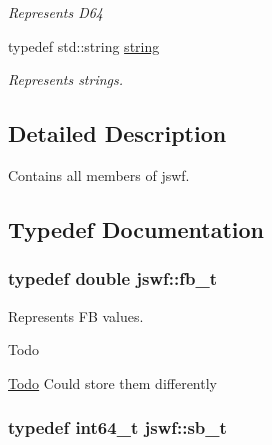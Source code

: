\begin{DoxyCompactItemize}
\begin{DoxyCompactList}\small\item\em Represents {\ttfamily D64} \end{DoxyCompactList}\item 
\hypertarget{namespacejswf_a755127d61081aa8af105eb800aa2c1ec}{typedef std\+::string \hyperlink{namespacejswf_a755127d61081aa8af105eb800aa2c1ec}{string}}\label{namespacejswf_a755127d61081aa8af105eb800aa2c1ec}

\begin{DoxyCompactList}\small\item\em Represents strings. \end{DoxyCompactList}\end{DoxyCompactItemize}


\subsection{Detailed Description}
Contains all members of jswf. 

\subsection{Typedef Documentation}
\hypertarget{namespacejswf_a419cb8aa8b625074e6753d189783b2f4}{
\subsubsection[{fb\+\_\+t}]{\setlength{\rightskip}{0pt plus 5cm}typedef double {\bf jswf\+::fb\+\_\+t}}}\label{namespacejswf_a419cb8aa8b625074e6753d189783b2f4}


Represents {\ttfamily F\+B} values. 

\begin{DoxyRefDesc}{Todo}
\item[\hyperlink{todo__todo000024}{Todo}]Could store them differently \end{DoxyRefDesc}
\hypertarget{namespacejswf_aa56b2b764590a9e19a5e66693364aceb}{
\subsubsection[{sb\+\_\+t}]{\setlength{\rightskip}{0pt plus 5cm}typedef int64\+\_\+t {\bf jswf\+::sb\+\_\+t}}}\label{namespacejswf_aa56b2b764590a9e19a5e66693364aceb}


